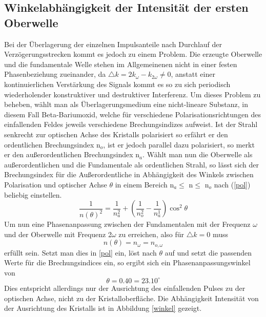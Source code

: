 \subsection{Winkelabhängigkeit der Intensität der ersten Oberwelle}
Bei der Überlagerung der einzelnen Impulsanteile nach Durchlauf der Verzögerungsstrecken kommt es jedoch zu einem Problem. Die erzeugte Oberwelle und die fundamentale Welle stehen im Allgemeinenen nicht in einer festen Phasenbeziehung zueinander, da $\triangle k=2k_\omega-k_{2\omega}\neq0$, anstatt einer kontinuierlichen Verstärkung des Signals kommt es so zu sich periodisch wiederholender konstruktiver und destruktiver Interferenz. Um dieses Problem zu beheben, wählt man als Überlagerungsmedium eine nicht-lineare Substanz, in diesem Fall Beta-Bariumoxid, welche für verschiedene Polarisationsrichtungen des einfallenden Feldes jeweils verschiedene Brechungsindizes aufweist. \newline
Ist der Strahl senkrecht zur optischen Achse des Kristalls polarisiert so erfährt er den ordentlichen Brechungsindex n$_o$, ist er jedoch parallel dazu polarisiert, so merkt er den außerordentlichen Brechungsindex n$_a$. \newline
Wählt man nun die Oberwelle als außerordentlichen und die Fundamentale als ordentlichen Strahl, so lässt sich der Brechungsindex für die Außerordentliche in Abhängigkeit des Winkels zwischen Polarisation und optischer Achse $\theta$ in einem Bereich n$_a\leq$ n$\leq$ n$_o$ nach (\ref{pol}) beliebig einstellen.
\begin{equation}
\frac{1}{n(\theta)^2}=\frac{1}{n_a^2}+\left(\frac{1}{n_o^2}-\frac{1}{n_a^1}\right)\cos^2\theta
\label{pol}
\end{equation}
Um nun eine Phasenanpassung zwischen der Fundamentalen mit der Frequenz $\omega$ und der Oberwelle mit Frequenz 2$\omega$ zu erreichen, also für $\triangle k=0$ muss
\begin{equation}
n(\theta)=n_\omega=n_{o,\omega}
\end{equation}
erfüllt sein. Setzt man dies in \ref{pol} ein, löst nach $\theta$ auf und setzt die passenden Werte für die Brechungsindices ein, so ergibt sich ein Phasenanpassungswinkel von
\begin{equation}
\theta=0.40=23.10^\circ
\end{equation}
Dies entspricht allerdings nur der Ausrichtung des einfallenden Pulses zu der optischen Achse, nicht zu der Kristalloberfläche. Die Abhängigkeit Intensität von der Ausrichtung des Kristalls ist in Abbildung \ref{winkel} gezeigt.
